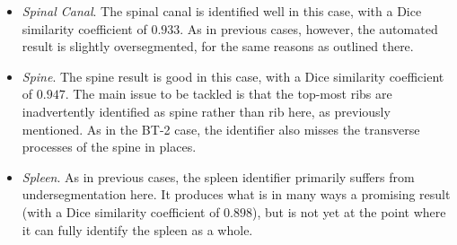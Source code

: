 \begin{itemize}
\newpage

\item \emph{Spinal Canal}. The spinal canal is identified well in this case, with a Dice similarity coefficient of $0.933$. As in previous cases, however, the automated result is slightly oversegmented, for the same reasons as outlined there.

\item \emph{Spine}. The spine result is good in this case, with a Dice similarity coefficient of $0.947$. The main issue to be tackled is that the top-most ribs are inadvertently identified as spine rather than rib here, as previously mentioned. As in the BT-2 case, the identifier also misses the transverse processes of the spine in places.

\item \emph{Spleen}. As in previous cases, the spleen identifier primarily suffers from undersegmentation here. It produces what is in many ways a promising result (with a Dice similarity coefficient of $0.898$), but is not yet at the point where it can fully identify the spleen as a whole.

\end{itemize}

